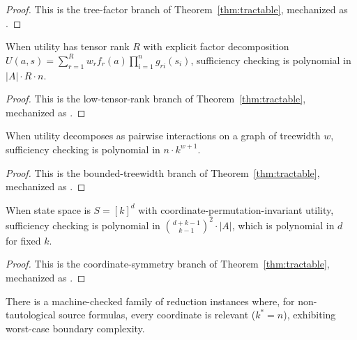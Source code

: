 \begin{proof}
This is the tree-factor branch of Theorem~\ref{thm:tractable}, mechanized as .
\end{proof}

\begin{corollary}\label{cor:practice-tensor}
When utility has tensor rank $R$ with explicit factor decomposition $U(a,s) = \sum_{r=1}^R w_r f_r(a) \prod_{i=1}^n g_{ri}(s_i)$, sufficiency checking is polynomial in $|A| \cdot R \cdot n$.
\end{corollary}

\begin{proof}
This is the low-tensor-rank branch of Theorem~\ref{thm:tractable}, mechanized as .
\end{proof}

\begin{corollary}\label{cor:practice-treewidth}
When utility decomposes as pairwise interactions on a graph of treewidth $w$, sufficiency checking is polynomial in $n \cdot k^{w+1}$.
\end{corollary}

\begin{proof}
This is the bounded-treewidth branch of Theorem~\ref{thm:tractable}, mechanized as .
\end{proof}

\begin{corollary}\label{cor:practice-symmetry}
When state space is $S = [k]^d$ with coordinate-permutation-invariant utility, sufficiency checking is polynomial in $\binom{d+k-1}{k-1}^2 \cdot |A|$, which is polynomial in $d$ for fixed $k$.
\end{corollary}

\begin{proof}
This is the coordinate-symmetry branch of Theorem~\ref{thm:tractable}, mechanized as .
\end{proof}

\begin{corollary}\label{cor:practice-unstructured}
There is a machine-checked family of reduction instances where, for non-tautological source formulas, every coordinate is relevant ($k^*=n$), exhibiting worst-case boundary complexity.
\end{corollary}

